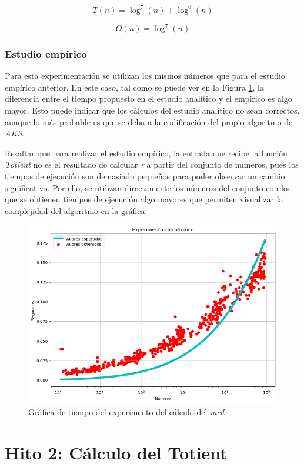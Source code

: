 \documentclass{uc3mpracticas}
\begin{document}
  $$ T(n) = \log^7(n) + \log^6(n)$$

  $$ O(n) = \log^7(n)$$




  \subsubsection{Estudio empírico}

  Para esta experimentación se utilizan los mismos números que para el estudio empírico anterior. En este caso, tal como se puede ver en la Figura \ref{fig:h2}, la diferencia entre el tiempo propuesto en el estudio analítico y el empírico es algo mayor. Esto puede indicar que los cálculos del estudio analítico no sean correctos, aunque lo más probable es que se deba a la codificación del propio algoritmo de \textit{AKS}.

  \vspace{2mm}

  Resaltar que para realizar el estudio empírico, la entrada que recibe la función \textit{Totient} no es el resultado de calcular \textit{r} a partir del conjunto de números, pues los tiempos de ejecución son demasiado pequeños para poder observar un cambio significativo. Por ello, se utilizan directamente los números del conjunto con los que se obtienen tiempos de ejecución algo mayores que permiten visualizar la complejidad del algoritmo en la gráfica.


  \begin{figure}[!h]
    \centering
    \includegraphics[width=.8\linewidth]{./Images/mcd.png}
    \caption{Gráfica de tiempo del experimento del cálculo del \textit{mcd}}
    \label{fig:h2}
  \end{figure}

  \newpage

  \section{Hito 2: Cálculo del Totient}
\end{document}
